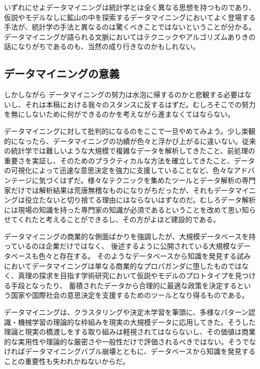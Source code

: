 いずれにせよデータマイニングは統計学とは全く異なる思想を持つものであり、仮説やモデルなしに鉱山の中を探索するデータマイニングにおいてよく登場する手法が、統計学の手法と異なるのは驚くべきことではないということが分かる。データマイニングが語られる文脈においてはテクニックやアルゴリズムありきの話になりがちであるのも、当然の成り行きなのかもしれない。

\subsection{データマイニングの意義}
しかしながら
データマイニングの努力は水泡に帰するのかと悲観する必要はないし、それは本稿における我々のスタンスに反するはずだ。むしろそこでの努力を無にしないために何ができるのかを考えながら進まなくてはならない。

データマイニングに対して批判的になるのをここで一旦やめてみよう。少し楽観的になったら、データマイニングの功績が色々と浮かび上がるに違いない。従来の統計学では難しいような大規模で複雑なデータを解析してきたこと、前処理の重要さを実証し、そのためのプラクティカルな方法を確立してきたこと、データの可視化によって迅速な意思決定を強力に支援していることなど、色々なアドバンテージに気づくはずだ。様々なテクニックを集めたツールとデータ解析の専門家だけでは解析結果は荒唐無稽なものになりがちだったが、それもデータマイニングは役立たないと切り捨てる理由にはならないはずなのだ。むしろデータ解析には現場の知識を持った専門家の知識が必須であるということを改めて思い知らせてくれたと考えることができるし、その方がよほど建設的である。

データマイニングの商業的な側面ばかりを強調したが、大規模データベースを持っているのは企業だけではなく、
後述するように公開されている大規模なデータベースも色々と存在する。
そのようなデータベースから知識を発見する試みにおいてデータマイニングは単なる商業的なプロパガンダに堕したものではなく、真理の探求を目指す学術研究において仮説やモデルのプロトタイプを見つける手段となったり、
蓄積されたデータから合理的に最適な政策を決定するという国家や国際社会の意思決定を支援するためのツールとなり得るものである。

データマイニングは、クラスタリングや決定木学習を筆頭に、多様なパターン認識・機械学習の理論的な枠組みを現実の大規模データに応用してきた。そうした理論と現実の橋渡しをする取り組みは軽視されてはならないし、その価値は商業的な実用性や理論的な厳密さや一般性だけで評価されるべきではない。そうでなければデータマイニングバブル崩壊とともに、データベースから知識を発見することの重要性も失われかねないからだ。

